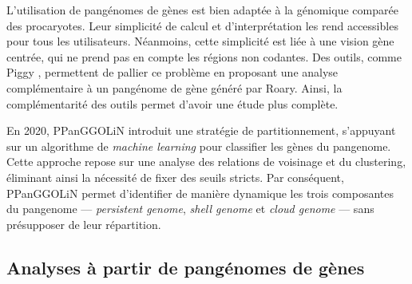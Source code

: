 L'utilisation de pangénomes de gènes est bien adaptée à la génomique comparée des procaryotes. Leur simplicité de calcul et d'interprétation les rend accessibles pour tous les utilisateurs. Néanmoins, cette simplicité est liée à une vision gène centrée, qui ne prend pas en compte les régions non codantes. Des outils, comme Piggy \cite{thorpe_piggy_2018}, permettent de pallier ce problème en proposant une analyse complémentaire à un pangénome de gène généré par Roary. Ainsi, la complémentarité des outils permet d'avoir une étude plus complète. 

En 2020, PPanGGOLiN \cite{gautreau_ppanggolin_2020} introduit une stratégie de partitionnement, s’appuyant sur un algorithme de \textit{machine learning} pour classifier les gènes du pangenome. Cette approche repose sur une analyse des relations de voisinage et du clustering, éliminant ainsi la nécessité de fixer des seuils stricts. Par conséquent, PPanGGOLiN permet d’identifier de manière dynamique les trois composantes du pangenome — \textit{persistent genome}, \textit{shell genome} et \textit{cloud genome} — sans présupposer de leur répartition.

\subsection{Analyses à partir de pangénomes de gènes}

